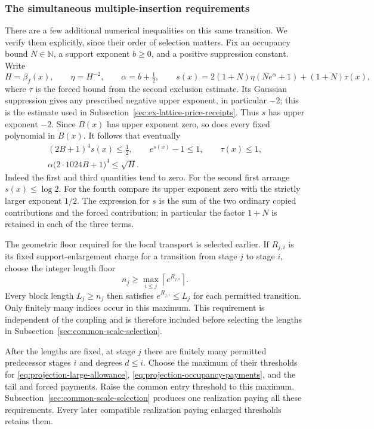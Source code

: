 \subsubsection{The simultaneous multiple-insertion requirements}
There are a few additional numerical inequalities on this same
transition. We verify them explicitly, since their order of
selection matters. Fix an occupancy bound $N\in\mathbb N$, a
support exponent $b\ge0$, and a positive suppression constant.
Write
\[
 H=\beta_f(x),\qquad \eta=H^{-2},\qquad
 \alpha=b+\tfrac12,\qquad
 s(x)=2(1+N)\eta(Ne^\alpha+1)+(1+N)\tau(x),
\]
where $\tau$ is the forced bound from the second exclusion
estimate. Its Gaussian suppression gives any prescribed negative
upper exponent, in particular $-2$; this is the estimate
used in Subsection~\ref{sec:ex-lattice-price-receipts}.
Thus $s$ has upper exponent $-2$. Since $B(x)$ has upper
exponent zero, so does every fixed polynomial in $B(x)$.
It follows that eventually
\begin{equation}\label{eq:projection-occupancy-payments}
 \begin{gathered}
 (2B+1)^4s(x)\le\tfrac12,\qquad
 e^{s(x)}-1\le1,\qquad \tau(x)\le1,\\
 \alpha\bigl(2\cdot1024B+1\bigr)^4\le\sqrt H.
 \end{gathered}
\end{equation}
Indeed the first and third quantities tend to zero. For the
second first arrange $s(x)\le\log2$. For the fourth compare its
upper exponent zero with the strictly larger exponent $1/2$.
The expression for $s$ is the sum of the two ordinary copied
contributions and the forced contribution; in particular the
factor $1+N$ is retained in each of the three terms.

The geometric floor required for the local transport is selected
earlier. If $R_{j,i}$ is its fixed support-enlargement charge for
a transition from stage $j$ to stage $i$, choose the integer
length floor
\[
        n_j\ge \max_{i\le j}\left\lceil e^{R_{j,i}}\right\rceil.
\]
Every block length $L_j\ge n_j$ then satisfies
$e^{R_{j,i}}\le L_j$ for each permitted transition. Only finitely
many indices occur in this maximum. This requirement is independent
of the coupling and is therefore included before selecting the
lengths in Subsection~\ref{sec:common-scale-selection}.

After the lengths are fixed, at stage $j$ there are finitely many
permitted predecessor stages $i$ and degrees $d\le i$. Choose the
maximum of their thresholds for
\eqref{eq:projection-large-allowance},
\eqref{eq:projection-occupancy-payments}, and the tail and forced
payments. Raise the common entry threshold to this maximum.
Subsection~\ref{sec:common-scale-selection} produces one realization
paying all these requirements. Every later compatible realization
paying enlarged thresholds retains them.

